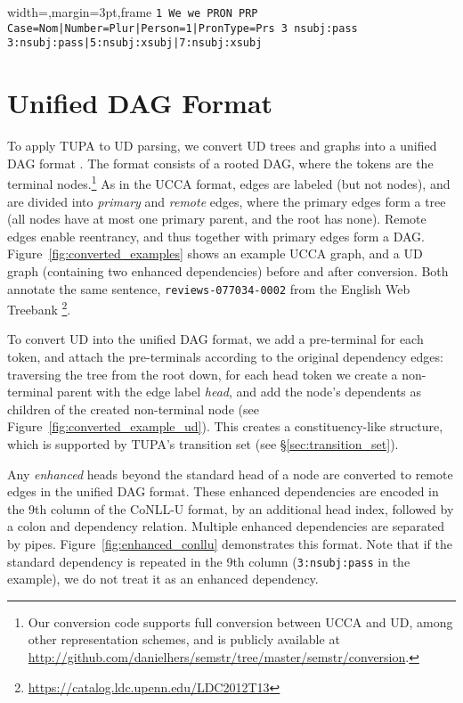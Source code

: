 \documentclass[11pt,a4paper]{article}
\begin{document}
\begin{figure*}[!t]
\begin{adjustbox}{width=\textwidth,margin=3pt,frame}
\texttt{1 We we PRON PRP Case=Nom|Number=Plur|Person=1|PronType=Prs 3 nsubj:pass 3:nsubj:pass|5:nsubj:xsubj|7:nsubj:xsubj}
\end{adjustbox}
\cprotect\caption{Example line from CoNLL-U file with two enhanced dependencies:
\verb|5:nsubj:xsubj| and \verb|7:nsubj:xsubj|.}\label{fig:enhanced_conllu}
\end{figure*}


\section{Unified DAG Format}\label{sec:format}

To apply TUPA to UD parsing,
we convert UD trees and graphs into a unified DAG format \cite{hershcovich2018multitask}.
The format consists of a rooted DAG, where the tokens are the terminal
nodes.\footnote{Our conversion code supports full conversion between UCCA and UD,
among other representation schemes,
and is publicly available at \url{http://github.com/danielhers/semstr/tree/master/semstr/conversion}.}
As in the UCCA format, edges are labeled (but not nodes),
and are divided into \textit{primary} and \textit{remote} edges,
where the primary edges form a tree (all nodes have at most one primary parent,
and the root has none).
Remote edges enable reentrancy, and thus together with primary edges
form a DAG.
Figure~\ref{fig:converted_examples} shows an example UCCA graph,
and a UD graph (containing two enhanced dependencies) before and after conversion.
Both annotate the same sentence, \verb|reviews-077034-0002| from the
English Web Treebank \cite{L14-1067}\footnote{\url{https://catalog.ldc.upenn.edu/LDC2012T13}}.

To convert UD into the unified DAG format,
we add a pre-terminal for each token,
and attach the pre-terminals according to the original dependency edges:
traversing the tree from the root down, for each head token we create a non-terminal
parent with the edge label {\it head},
and add the node's dependents as children of the created non-terminal node
(see Figure~\ref{fig:converted_example_ud}).
This creates a constituency-like structure,
which is supported by TUPA's transition set (see \S\ref{sec:transition_set}).

Any \textit{enhanced}
heads beyond the standard head of a node are converted to remote edges in the unified DAG format.
These enhanced dependencies are encoded in the 9th column of the \mbox{CoNLL-U} format,
by an additional head index, followed by a colon and dependency relation.
Multiple enhanced dependencies are separated by pipes.
Figure~\ref{fig:enhanced_conllu} demonstrates this format.
Note that if the standard dependency is repeated in the 9th column
(\verb|3:nsubj:pass| in the example), we do not treat it as an enhanced dependency.
\end{document}
